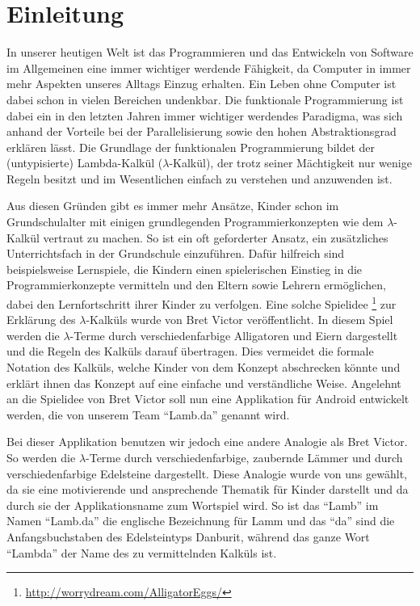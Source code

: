 \section{Einleitung}

In unserer heutigen Welt ist das Programmieren und das Entwickeln von Software im Allgemeinen eine immer wichtiger werdende Fähigkeit, da Computer in immer mehr Aspekten unseres Alltags Einzug erhalten. Ein Leben ohne Computer ist dabei schon in vielen Bereichen undenkbar. \newline 
Die funktionale Programmierung ist dabei ein in den letzten Jahren immer wichtiger werdendes Paradigma, was sich anhand der Vorteile bei der Parallelisierung sowie den hohen Abstraktionsgrad erklären lässt. Die Grundlage der funktionalen Programmierung bildet der (untypisierte) Lambda-Kalkül ($\lambda$-Kalkül), der trotz seiner Mächtigkeit nur wenige Regeln besitzt und im Wesentlichen einfach zu verstehen und anzuwenden ist.

Aus diesen Gründen gibt es immer mehr Ansätze, Kinder schon im Grundschulalter mit einigen grundlegenden Programmierkonzepten wie dem $\lambda$-Kalkül vertraut zu machen. So ist ein oft geforderter Ansatz, ein zusätzliches Unterrichtsfach in der Grundschule einzuführen. Dafür hilfreich sind beispielsweise Lernspiele, die Kindern einen spielerischen Einstieg in die Programmierkonzepte vermitteln und den Eltern sowie Lehrern ermöglichen, dabei den Lernfortschritt ihrer Kinder zu verfolgen.\newline
Eine solche Spielidee \footnote{\url{http://worrydream.com/AlligatorEggs/}} zur Erklärung des $\lambda$-Kalküls wurde von Bret Victor veröffentlicht. In diesem Spiel werden die $\lambda$-Terme durch verschiedenfarbige Alligatoren und Eiern dargestellt und die Regeln des Kalküls darauf übertragen. Dies vermeidet die formale Notation des Kalküls, welche Kinder von dem Konzept abschrecken könnte und erklärt ihnen das Konzept auf eine einfache und verständliche Weise. Angelehnt an die Spielidee von Bret Victor soll nun eine Applikation für Android entwickelt werden, die von unserem Team "`Lamb.da"' genannt wird. 

Bei dieser Applikation benutzen wir jedoch eine andere Analogie als Bret Victor. So werden die $\lambda$-Terme durch verschiedenfarbige, zaubernde Lämmer und durch verschiedenfarbige Edelsteine dargestellt. Diese Analogie wurde von uns gewählt, da sie eine motivierende und ansprechende Thematik für Kinder darstellt und da durch sie der Applikationsname zum Wortspiel wird. So ist das "`Lamb"' im Namen "`Lamb.da"' die englische Bezeichnung für Lamm und das "`da"' sind die Anfangsbuchstaben des Edelsteintyps Danburit, während das ganze Wort "`Lambda"' der Name des zu vermittelnden Kalküls ist. 

